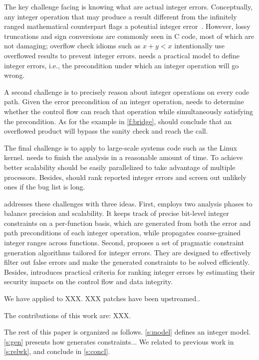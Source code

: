 The key challenge facing \sys is knowing what are actual integer
errors.  Conceptually, any integer operation that may produce a result
different from the infinitely ranged mathematical counterpart flags
a potential integer error~\cite{air}.  However, lossy truncations
and sign conversions are commonly seen in C code, most of which are
not damaging; overflow check idioms such as $x + y < x$ intentionally
use overflowed results to prevent integer errors.  \sys needs a
practical model to define integer errors, i.e., the precondition
under which an integer operation will go wrong.

A second challenge is to precisely reason about integer operations
on every code path.  Given the error precondition of an integer
operation, \sys needs to determine whether the control flow can
reach that operation while simultaneously satisfying the precondition.
As for the example in \autoref{f:bridge}, \sys should conclude that
an overflowed product  will bypass the sanity check and
reach the  call.

The final challenge is to apply \sys to large-scale systems code
such as the Linux kernel.  \sys needs to finish the analysis in a
reasonable amount of time.  To achieve better scalability \sys
should be easily parallelized to take advantage of multiple processors.
Besides, \sys should rank reported integer errors and screen out
unlikely ones if the bug list is long.

\sys addresses these challenges with three ideas.  First, \sys
employs two analysis phases to balance precision and scalability.
It keeps track of precise bit-level integer constraints on a
per-function basis, which are generated from both the error and
path preconditions of each integer operation, while propagates
coarse-grained integer ranges across functions.  Second, \sys
proposes a set of pragmatic constraint generation algorithms tailored
for integer errors.  They are designed to effectively filter out
false errors and make the generated constraints to be solved
efficiently.  Besides, \sys introduces practical criteria for ranking
integer errors by estimating their security impacts on the control
flow and data integrity.

We have applied \sys to XXX.  XXX patches have been upstreamed..

The contributions of this work are: XXX.

The rest of this paper is organized as follows. \autoref{s:model}
defines an integer model.  \autoref{s:gen} presents how \sys generates
constraints...  We related \sys to previous work in \autoref{s:relwk},
and conclude in \autoref{s:concl}.
